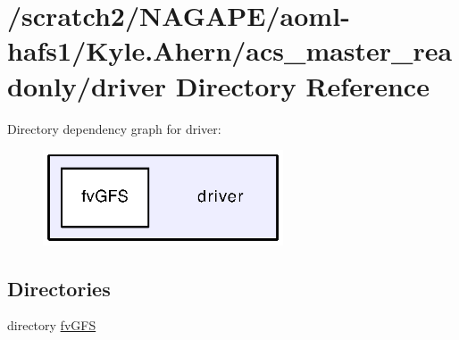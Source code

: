 \section{/scratch2/\-N\-A\-G\-A\-P\-E/aoml-\/hafs1/\-Kyle.Ahern/acs\-\_\-master\-\_\-readonly/driver Directory Reference}
\label{dir_1284b95147afa48b330f502c8bbc0529}
Directory dependency graph for driver\-:
\nopagebreak
\begin{figure}[H]
\begin{center}
\leavevmode
\includegraphics[width=202pt]{dir_1284b95147afa48b330f502c8bbc0529_dep}
\end{center}
\end{figure}
\subsection*{Directories}
\begin{DoxyCompactItemize}
\item 
directory \hyperlink{dir_ef13d85282fd0ff3db59aa5e99d2bcaa}{fv\-G\-F\-S}
\end{DoxyCompactItemize}
